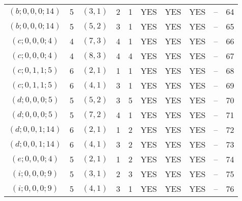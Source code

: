 \begin{longtable}{|c|c|c|c|c|c|c|c|c|c|}
$(b; 0, 0, 0; 14)$ & 5 & $(3, 1)$ & 2 & 1 & YES & YES & YES & -- & 64\\
$(b; 0, 0, 0; 14)$ & 5 & $(5, 2)$ & 3 & 1 & YES & YES & YES & -- & 65\\
$(c; 0, 0, 0; 4)$ & 4 & $(7, 3)$ & 4 & 1 & YES & YES & YES & -- & 66\\
$(c; 0, 0, 0; 4)$ & 4 & $(8, 3)$ & 4 & 4 & YES & YES & YES & -- & 67\\
$(c; 0, 1, 1; 5)$ & 6 & $(2, 1)$ & 1 & 1 & YES & YES & YES & -- & 68\\
$(c; 0, 1, 1; 5)$ & 6 & $(4, 1)$ & 3 & 1 & YES & YES & YES & -- & 69\\
$(d; 0, 0, 0; 5)$ & 5 & $(5, 2)$ & 3 & 5 & YES & YES & YES & -- & 70\\
$(d; 0, 0, 0; 5)$ & 5 & $(7, 2)$ & 4 & 1 & YES & YES & YES & -- & 71\\
$(d; 0, 0, 1; 14)$ & 6 & $(2, 1)$ & 1 & 2 & YES & YES & YES & -- & 72\\
$(d; 0, 0, 1; 14)$ & 6 & $(4, 1)$ & 3 & 2 & YES & YES & YES & -- & 73\\
$(e; 0, 0, 0; 4)$ & 5 & $(2, 1)$ & 1 & 2 & YES & YES & YES & -- & 74\\
$(i; 0, 0, 0; 9)$ & 5 & $(3, 1)$ & 2 & 3 & YES & YES & YES & -- & 75\\
$(i; 0, 0, 0; 9)$ & 5 & $(4, 1)$ & 3 & 1 & YES & YES & YES & -- & 76
\end{longtable}

